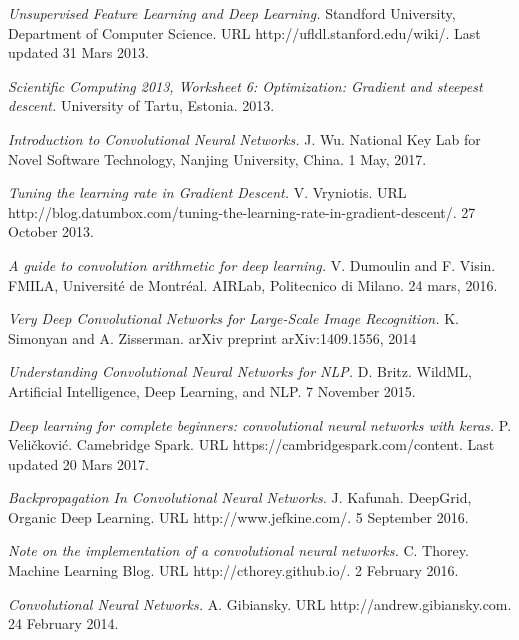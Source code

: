 \documentclass[a4paper, twoside]{article}
\begin{document}
\begin{thebibliography}{99}
	\textit{Unsupervised Feature Learning and Deep Learning.}
    Standford University, Department of Computer Science.
    URL http://ufldl.stanford.edu/wiki/.
	Last updated 31 Mars 2013.	
	

	
	\textit{Scientific Computing 2013, Worksheet 6: Optimization: Gradient and steepest descent.}
    University of Tartu, Estonia.
    2013.
    
	\textit{Introduction to Convolutional Neural Networks.}
    J. Wu. 
    National Key Lab for Novel Software Technology, Nanjing University, China.
    1 May, 2017.
    
	\textit{Tuning the learning rate in Gradient Descent.}
	 V. Vryniotis.
	URL http://blog.datumbox.com/tuning-the-learning-rate-in-gradient-descent/.
	27 October 2013.    
   
	\textit{A guide to convolution arithmetic for deep learning.}
    V. Dumoulin  and F. Visin.
    FMILA, Université de Montréal. AIRLab, Politecnico di Milano.
	24 mars, 2016.
	
	\textit{Very Deep Convolutional Networks for Large-Scale Image Recognition.}
	K. Simonyan and
    A. Zisserman.
    arXiv preprint arXiv:1409.1556, 2014
    
    



	
	\textit{Understanding Convolutional Neural Networks for NLP.}
	D. Britz.
	WildML, Artificial Intelligence, Deep Learning, and NLP.
	7 November 2015.
	
	
	
	\textit{Deep learning for complete beginners: convolutional neural networks with keras.}
	P. Veličković.
	Camebridge Spark. 
	URL https://cambridgespark.com/content.
	Last updated 20 Mars 2017.
	
	    
	\textit{Backpropagation In Convolutional Neural Networks.}
	J. Kafunah.
    DeepGrid, Organic Deep Learning. 
    URL http://www.jefkine.com/.
	5 September 2016.
	
	
	\textit{Note on the implementation of a convolutional neural networks.}
	C. Thorey.
    Machine Learning Blog. 
    URL http://cthorey.github.io/.
	2 February 2016.
	
	
	
	\textit{Convolutional Neural Networks.}
	A. Gibiansky.
    URL http://andrew.gibiansky.com.
	24 February 2014.
	

\end{thebibliography}
\end{document}

